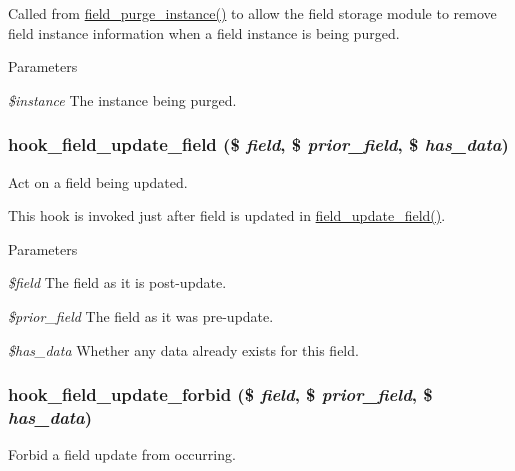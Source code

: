 Called from \hyperlink{group__field__purge_ga766cee439c7c920d3d406c7af41c8968}{field\_\-purge\_\-instance()} to allow the field storage module to remove field instance information when a field instance is being purged.


\begin{DoxyParams}{Parameters}
\item[{\em \$instance}]The instance being purged. \end{DoxyParams}
\hypertarget{group__field__crud_ga4f06c14e6fb60ec1903c005ddbb4ee83}{
\subsubsection[{hook\_\-field\_\-update\_\-field}]{\setlength{\rightskip}{0pt plus 5cm}hook\_\-field\_\-update\_\-field (\$ {\em field}, \/  \$ {\em prior\_\-field}, \/  \$ {\em has\_\-data})}}
\label{group__field__crud_ga4f06c14e6fb60ec1903c005ddbb4ee83}
Act on a field being updated.

This hook is invoked just after field is updated in \hyperlink{group__field__crud_gacca7d1f76963048aa84b1c9a271876f5}{field\_\-update\_\-field()}.


\begin{DoxyParams}{Parameters}
\item[{\em \$field}]The field as it is post-\/update. \item[{\em \$prior\_\-field}]The field as it was pre-\/update. \item[{\em \$has\_\-data}]Whether any data already exists for this field. \end{DoxyParams}
\hypertarget{group__field__crud_ga7bd0ccd40a9a3690b697b68d03f660a4}{
\subsubsection[{hook\_\-field\_\-update\_\-forbid}]{\setlength{\rightskip}{0pt plus 5cm}hook\_\-field\_\-update\_\-forbid (\$ {\em field}, \/  \$ {\em prior\_\-field}, \/  \$ {\em has\_\-data})}}
\label{group__field__crud_ga7bd0ccd40a9a3690b697b68d03f660a4}
Forbid a field update from occurring.

